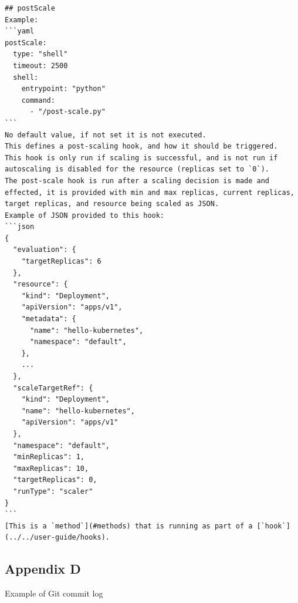 \begin{lstlisting}
## postScale
Example:
```yaml
postScale: 
  type: "shell"
  timeout: 2500
  shell: 
    entrypoint: "python"
    command: 
      - "/post-scale.py"
```
No default value, if not set it is not executed.  
This defines a post-scaling hook, and how it should be triggered.  
This hook is only run if scaling is successful, and is not run if autoscaling is disabled for the resource (replicas set to `0`).
The post-scale hook is run after a scaling decision is made and effected, it is provided with min and max replicas, current replicas, target replicas, and resource being scaled as JSON.  
Example of JSON provided to this hook:
```json
{
  "evaluation": {
    "targetReplicas": 6
  },
  "resource": {
    "kind": "Deployment",
    "apiVersion": "apps/v1",
    "metadata": {
      "name": "hello-kubernetes",
      "namespace": "default",
    },
    ...
  },
  "scaleTargetRef": {
    "kind": "Deployment",
    "name": "hello-kubernetes",
    "apiVersion": "apps/v1"
  },
  "namespace": "default",
  "minReplicas": 1,
  "maxReplicas": 10,
  "targetReplicas": 0,
  "runType": "scaler"
}
```
[This is a `method`](#methods) that is running as part of a [`hook`](../../user-guide/hooks).
\end{lstlisting}
\newpage

\subsection{Appendix D}

Example of Git commit log

